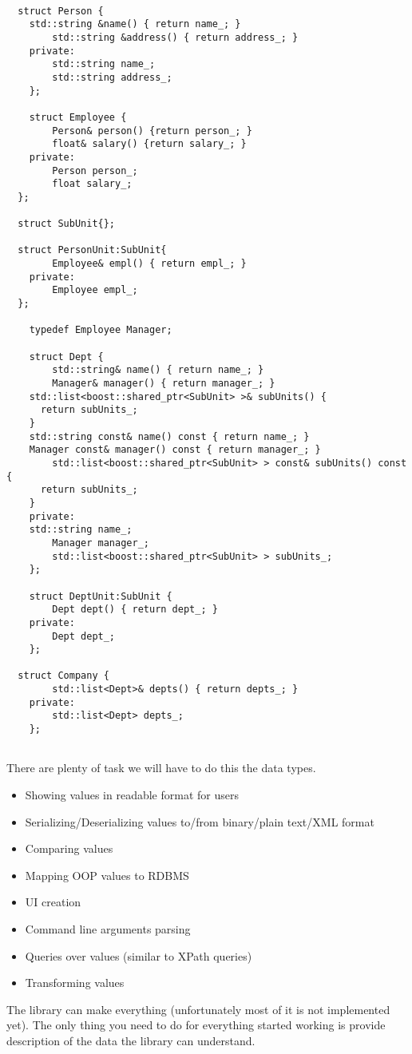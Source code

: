 \documentclass[a4paper]{article}
\begin{document}
\begin{lstlisting}

  struct Person {
    std::string &name() { return name_; }
		std::string &address() { return address_; }
	private:
 		std::string name_;
		std::string address_;
	};

	struct Employee {
		Person& person() {return person_; }
		float& salary() {return salary_; }
	private:
		Person person_;
		float salary_;
  };

  struct SubUnit{};

  struct PersonUnit:SubUnit{
		Employee& empl() { return empl_; }
	private:
		Employee empl_;
  };

	typedef Employee Manager;
  
	struct Dept {
		std::string& name() { return name_; }
	    Manager& manager() { return manager_; }
    std::list<boost::shared_ptr<SubUnit> >& subUnits() {
      return subUnits_;
    }
    std::string const& name() const { return name_; }
    Manager const& manager() const { return manager_; }
		std::list<boost::shared_ptr<SubUnit> > const& subUnits() const {
      return subUnits_;
    }
	private:
    std::string name_;
		Manager manager_;
		std::list<boost::shared_ptr<SubUnit> > subUnits_;
	};

	struct DeptUnit:SubUnit {
		Dept dept() { return dept_; }
	private:
		Dept dept_;
	};

  struct Company {
		std::list<Dept>& depts() { return depts_; }
	private:
		std::list<Dept> depts_;
	};
  
\end{lstlisting}

There are plenty of task we will have to do this the data types.

\begin{itemize}
  \item{Showing values in readable format for users}
  \item{Serializing/Deserializing values to/from binary/plain text/XML format}
  \item{Comparing values}
  \item{Mapping OOP values to RDBMS}
  \item{UI creation}
  \item{Command line arguments parsing}
  \item{Queries over values (similar to XPath queries)}
  \item{Transforming values}
\end{itemize}

The library can make everything (unfortunately most of it is not implemented yet).
The only thing you need to do for everything started working is provide description
of the data the library can understand.
\end{document}
